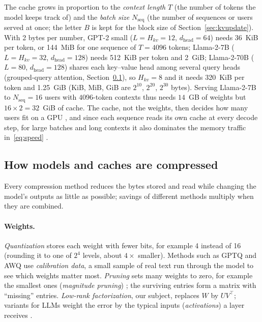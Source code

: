 \documentclass[10pt]{article}
\theoremstyle{plain}
\theoremstyle{definition}
\theoremstyle{remark}
\newcommand{\T}{^{\top}}
\newcommand{\dhead}{d_{\mathrm{head}}}
\begin{document}
The cache grows in proportion to the \emph{context length} $T$ (the number of tokens the model keeps track of) and the \emph{batch size} $N_{\mathrm{seq}}$ (the number of sequences or users served at once; the letter $B$ is kept for the block size of Section~\ref{sec:kvupdate}). With 2 bytes per number, GPT-2 small ($L=H_{kv}=12$, $\dhead=64$) needs 36~KiB per token, or 144~MiB for one sequence of $T=4096$ tokens; Llama-2-7B \cite{touvron2023} ($L=H_{kv}=32$, $\dhead=128$) needs 512~KiB per token and 2~GiB; Llama-2-70B ($L=80$, $\dhead=128$) shares each key--value head among several query heads (grouped-query attention, Section~\ref{sec:families}), so $H_{kv}=8$ and it needs 320~KiB per token and 1.25~GiB (KiB, MiB, GiB are $2^{10}$, $2^{20}$, $2^{30}$ bytes). Serving Llama-2-7B to $N_{\mathrm{seq}}=16$ users with $4096$-token contexts thus needs $14$~GB of weights but $16\times2=32$~GiB of cache. The cache, not the weights, then decides how many users fit on a GPU \cite{kwon2023vllm}, and since each sequence reads its own cache at every decode step, for large batches and long contexts it also dominates the memory traffic in~\eqref{eq:speed} \cite{pope2023}.

\subsection{How models and caches are compressed}
\label{sec:families}

Every compression method reduces the bytes stored and read while changing the model's outputs as little as possible; savings of different methods multiply when they are combined.

\paragraph{Weights.}
\emph{Quantization} stores each weight with fewer bits, for example 4 instead of 16 (rounding it to one of $2^4$ levels, about $4\times$ smaller). Methods such as GPTQ \cite{frantar2023gptq} and AWQ \cite{lin2024awq} use \emph{calibration data}, a small sample of real text run through the model to see which weights matter most. \emph{Pruning} sets many weights to zero, for example the smallest ones (\emph{magnitude pruning}) \cite{han2016}; the surviving entries form a matrix with ``missing'' entries. \emph{Low-rank factorization}, our subject, replaces $W$ by $UV\T$; variants for LLMs weight the error by the typical inputs (\emph{activations}) a layer receives \cite{hsu2022,wang2025svdllm,yuan2023asvd}.
\end{document}
